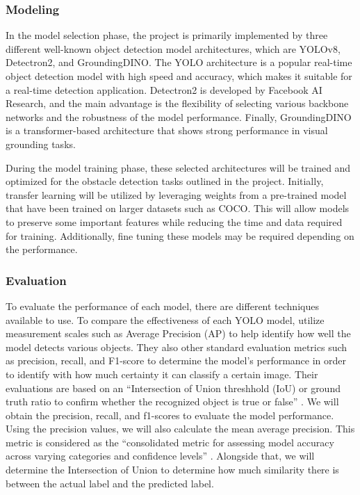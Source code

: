 \documentclass[stu,12pt,floatsintext]{apa7}
\begin{document}

\subsubsection{Modeling}

In the model selection phase, the project is primarily implemented by three different well-known object detection model architectures, which are YOLOv8, Detectron2, and GroundingDINO. The YOLO architecture is a popular real-time object detection model with high speed and accuracy, which makes it suitable for a real-time detection application. Detectron2 is developed by Facebook AI Research, and the main advantage is the flexibility of selecting various backbone networks and the robustness of the model performance. Finally, GroundingDINO is a transformer-based architecture that shows strong performance in visual grounding tasks.

During the model training phase, these selected architectures will be trained and optimized for the obstacle detection tasks outlined in the project. Initially, transfer learning will be utilized by leveraging weights from a pre-trained model that have been trained on larger datasets such as COCO. This will allow models to preserve some important features while reducing the time and data required for training. Additionally, fine tuning these models may be required depending on the performance.



\subsubsection{Evaluation}
To evaluate the performance of each model, there are different techniques available to use. To compare the effectiveness of each YOLO model, \textcite{quach_evaluating_2023} utilize measurement scales such as Average Precision (AP) to help identify how well the model detects various objects. They also other standard evaluation metrics such as precision, recall, and F1-score to determine the model's performance in order to identify with how much certainty it can classify a certain image. Their evaluations are based on an ``Intersection of Union threshhold (IoU) or ground truth ratio to confirm whether the recognized object is true or false'' \parencite{quach_evaluating_2023}. We will obtain the precision, recall, and f1-scores to evaluate the model performance. Using the precision values, we will also calculate the mean average precision. This metric is considered as the ``consolidated metric for assessing model accuracy across varying categories and confidence levels'' \parencite{safaldin_improved_2024}. Alongside that, we will determine the Intersection of Union to determine how much similarity there is between the actual label and the predicted label.
\end{document}
